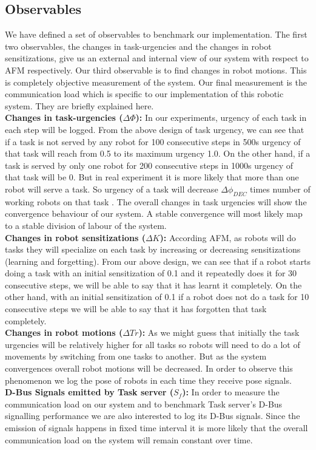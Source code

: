 \documentclass{llncs}
\begin{document}
\subsection{Observables}
We have defined a set of observables to benchmark our implementation. The first two observables, the changes in task-urgencies and the changes in robot sensitizations, give us an external and internal view of our system with respect to AFM respectively. Our third observable is to find changes in robot motions. This is completely objective measurement of the system. Our final measurement is the communication load which is specific to our implementation of this robotic system. They are briefly explained here.\\
\textbf{Changes in task-urgencies ($\Delta \Phi$): }
In our experiments, urgency of each task in each step will be logged. From the above design of task urgency, we can see that if a task is not served by any robot for 100 consecutive steps in 500s urgency of that task will reach from 0.5 to its maximum urgency 1.0. On the other hand, if a task is served by only one robot for 200 consecutive steps in 1000s urgency of that task will be 0. But in real experiment it is more likely that more than one robot will serve a task. So urgency of a task will decrease $\Delta\phi_{DEC}$ times number of working robots on that task \cite{Elsa}. The overall changes in task urgencies will show the convergence behaviour of our system. A stable convergence will most likely map to a stable division of labour of the system.\\
\textbf{Changes in robot sensitizations ($\Delta K$): }
According AFM, as robots will do tasks they will specialize on each task by increasing or decreasing sensitizations (learning and forgetting). From our above design, we can see that if a robot starts doing a task with an initial sensitization of 0.1 and it repeatedly does it for 30 consecutive steps, we will be able to say that it has learnt it completely. On the other hand, with an initial sensitization of 0.1 if a robot does not do a task for 10 consecutive steps we will be able to say that it has forgotten that task completely.\\
\textbf{Changes in robot motions ($\Delta Tr$): }
As we might guess that initially the task urgencies will be relatively higher for all tasks so robots will need to do a lot of movements by switching from one tasks to another. But as the system convergences overall robot motions will be decreased. In order to observe this phenomenon we log the pose of robots in each time they receive pose signals.\\
\textbf{D-Bus Signals emitted by Task server ($S_f$):} 
In order to measure the communication load on our system and to benchmark Task server's D-Bus signalling performance we are also interested to log its D-Bus signals. Since the emission of signals happens in fixed time interval it is more likely that the overall communication load on the system will remain constant over time.
%
% 
\end{document}

